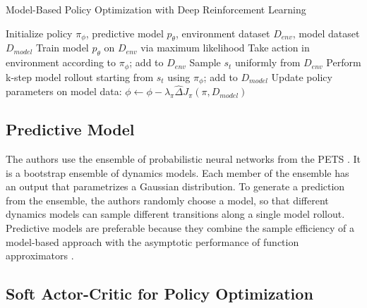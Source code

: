 \begin{algorithm}
\caption{Model-Based Policy Optimization with Deep Reinforcement Learning}\label{euclid}
\begin{algorithmic}[1]
\State Initialize policy $\pi_{\phi}$, predictive model $p_{\theta}$, environment dataset $D_{env}$, model dataset $D_{model}$
\State Train model $p_{\theta}$ on $D_{env}$ via maximum likelihood
\State Take action in environment according to $\pi_{\phi}$; add to $D_{env}$
\State Sample $s_{t}$ uniformly from $D_{env}$
\State Perform k-step model rollout starting from $s_{t}$ using $\pi_{\phi}$; add to $D_{model}$
\EndFor
{}
\State Update policy parameters on model data: $\phi \leftarrow \phi - \lambda_{\pi} \hat{\Delta} J_{\pi}(\pi, D_{model})$
\EndFor
\EndFor
\EndFor
\end{algorithmic}
\end{algorithm}

\subsection{Predictive Model}

The authors use the ensemble of probabilistic neural networks from the PETS \cite{ref6}. It is a bootstrap ensemble of dynamics models. Each member of the ensemble has an output that parametrizes a Gaussian distribution. To generate a prediction from the ensemble, the authors randomly choose a model, so that different dynamics models can sample different transitions along a single model rollout. Predictive models are preferable because they combine the sample efficiency of a model-based approach with the asymptotic performance of function approximators \cite{ref7}.

\subsection{Soft Actor-Critic for Policy Optimization}

